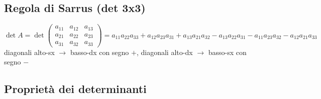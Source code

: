 \documentclass[a4paper]{article}
\begin{document}
\subsection{Regola di Sarrus (det 3x3)}
\(\det A = \det \left( \begin{matrix}
	a_{11} & a_{12} & a_{13} \\
	a_{21} & a_{22} & a_{23} \\
	a_{31} & a_{32} & a_{33}
\end{matrix} \right) = a_{11} a_{22} a_{33} + a_{12} a_{23} a_{31} + a_{13} a_{21} a_{32} - a_{13} a_{22} a_{31} - a_{11} a_{23} a_{32} - a_{12} a_{21} a_{33}\)
diagonali alto-sx \(\to\) basso-dx con segno \(+\), diagonali alto-dx \(\to\) basso-sx con segno \(-\)

\subsection{Proprietà dei determinanti}
\end{document}

